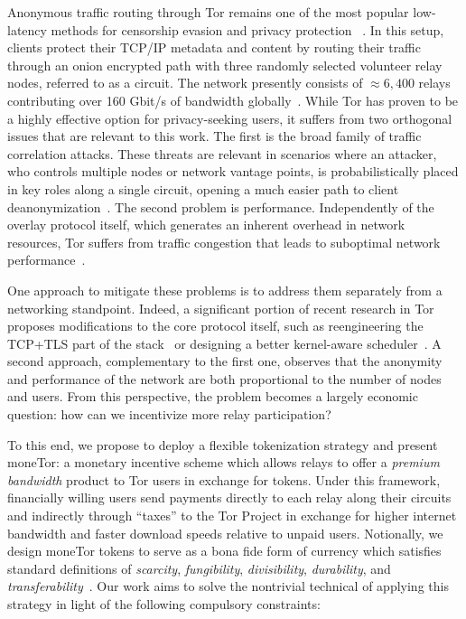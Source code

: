 Anonymous traffic routing through Tor remains one of the most popular
low-latency methods for censorship evasion and privacy protection
~\cite{dingledine2004tor}. In this setup, clients protect their TCP/IP
metadata and content by routing their traffic through an onion
encrypted path with three randomly selected volunteer relay nodes,
referred to as a circuit. The network presently consists of
$\approx 6,400$ relays contributing over 160 Gbit/s of bandwidth
globally~\cite{portal2018tormetrics}. While Tor has proven to be a
highly effective option for privacy-seeking users, it suffers from two
orthogonal issues that are relevant to this work. The first is the
broad family of traffic correlation attacks. These threats are relevant in
scenarios where an attacker, who controls multiple nodes or network
vantage points, is probabilistically placed in key roles along a
single circuit, opening a much easier path to client
deanonymization~\cite{wright2004predecessor,murdoch2005low}. The
second problem is performance. Independently of the overlay protocol
itself, which generates an inherent overhead in network resources, Tor
suffers from  traffic congestion that leads to suboptimal
network performance~\cite{portal2018tormetrics,
  alsabah2016performance}.

One approach to mitigate these problems is to address them separately
from a networking standpoint. Indeed, a significant portion of recent
research in Tor proposes modifications to the core protocol itself,
such as reengineering the TCP+TLS part of the
stack~\cite{reardon2009improving} or designing a better kernel-aware
scheduler~\cite{jansen2014never}. A second approach, complementary to
the first one, observes that the anonymity and performance of the
network are both proportional to the number of nodes and users. From
this perspective, the problem becomes a largely economic question: how
can we incentivize more relay participation?

To this end, we propose to deploy a flexible tokenization strategy and present
moneTor: a monetary incentive scheme which allows relays to offer a
\emph{premium bandwidth} product to Tor users in exchange for tokens. Under this
framework, financially willing users send payments directly to each relay along
their circuits and indirectly through ``taxes'' to the Tor Project in exchange
for higher internet bandwidth and faster download speeds relative to unpaid
users. Notionally, we design moneTor tokens to serve as a bona fide form of
currency which satisfies standard definitions of \textit{scarcity},
\textit{fungibility}, \textit{divisibility}, \textit{durability}, and
\textit{transferability}~\cite[p.3]{crump2011phenomenon}. Our work aims to solve
the nontrivial technical of applying this strategy in light of the following
compulsory constraints:

